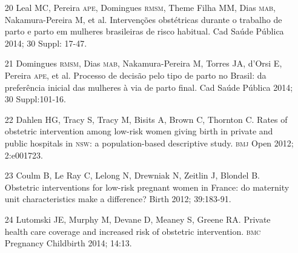 \documentclass{article}
\begin{document}
\begin{itemize}
\item[20] Leal MC, Pereira \textsc{ape}, Domingues \textsc{rmsm}, Theme Filha MM, Dias \textsc{mab},
Nakamura-Pereira M, et al. Intervenções obstétricas durante o trabalho de parto
e parto em mulheres brasileiras de risco habitual. Cad Saúde Pública 2014; 30
Suppl: 17-47.

\item[21] Domingues \textsc{rmsm}, Dias \textsc{mab}, Nakamura-Pereira M, Torres JA, d’Orsi E,
Pereira \textsc{ape}, et al. Processo de decisão pelo tipo de parto no Brasil: da
preferência inicial das mulheres à via de parto final. Cad Saúde Pública 2014;
30 Suppl:101-16.

\item[22] Dahlen HG, Tracy S, Tracy M, Bisits A, Brown C, Thornton C. Rates
of obstetric intervention among low-risk women giving birth in private and
public hospitals in \textsc{nsw}: a population-based descriptive study. \textsc{bmj} Open 2012;
2:e001723.

\item[23] Coulm B, Le Ray C, Lelong N, Drewniak N, Zeitlin J, Blondel B.
Obstetric interventions for low-risk pregnant women in France: do maternity unit
characteristics make a difference? Birth 2012; 39:183-91.

\item[24] Lutomski JE, Murphy M, Devane D, Meaney S, Greene RA. Private
health care coverage and increased risk of obstetric intervention. \textsc{bmc} Pregnancy
Childbirth 2014; 14:13.

\end{itemize}
\end{document}
